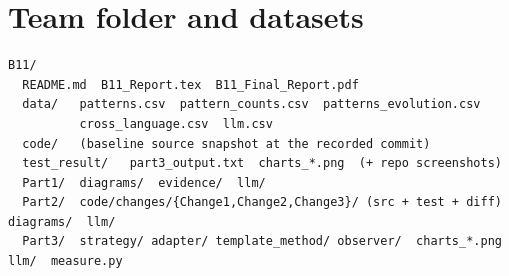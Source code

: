 \documentclass[11pt,a4paper]{article}
\begin{document}
\section{Team folder and datasets}
\begin{verbatim}
B11/
  README.md  B11_Report.tex  B11_Final_Report.pdf
  data/   patterns.csv  pattern_counts.csv  patterns_evolution.csv
          cross_language.csv  llm.csv
  code/   (baseline source snapshot at the recorded commit)
  test_result/   part3_output.txt  charts_*.png  (+ repo screenshots)
  Part1/  diagrams/  evidence/  llm/
  Part2/  code/changes/{Change1,Change2,Change3}/ (src + test + diff)  diagrams/  llm/
  Part3/  strategy/ adapter/ template_method/ observer/  charts_*.png  llm/  measure.py
\end{verbatim}
\end{document}
